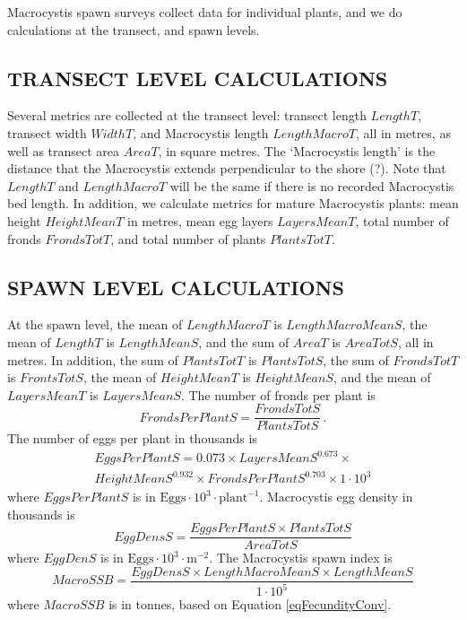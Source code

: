 \documentclass[12pt]{article}
\begin{document}
Macrocystis spawn surveys collect data for individual plants, and we do calculations at the transect, and spawn levels.

\subsection{TRANSECT LEVEL CALCULATIONS}

Several metrics are collected at the transect level: transect length $LengthT$, transect width $WidthT$, and Macrocystis length $LengthMacroT$, all in metres, as well as transect area $AreaT$, in square metres.
The `Macrocystis length' is the distance that the Macrocystis extends perpendicular to the shore (?).
Note that $LengthT$ and $LengthMacroT$ will be the same if there is no recorded Macrocystis bed length.
In addition, we calculate metrics for mature Macrocystis plants: mean height $HeightMeanT$ in metres, mean egg layers $LayersMeanT$, total number of fronds $FrondsTotT$, and total number of plants $PlantsTotT$.

\subsection{SPAWN LEVEL CALCULATIONS}

At the spawn level, the mean of $LengthMacroT$ is $LengthMacroMeanS$, the mean of $LengthT$ is $LengthMeanS$, and the sum of $AreaT$ is $AreaTotS$, all in metres.
In addition, the sum of $PlantsTotT$ is $PlantsTotS$, the sum of $FrondsTotT$ is $FrontsTotS$, the mean of $HeightMeanT$ is $HeightMeanS$, and the mean of $LayersMeanT$ is $LayersMeanS$. 
The number of fronds per plant is
\begin{equation}
FrondsPerPlantS = \frac{FrondsTotS} {PlantsTotS} \, .
\label{eqFrondsPerPlant}
\end{equation}
The number of eggs per plant in thousands is \citep{HaegeleSchweigert1990}
\begin{multline}
EggsPerPlantS = 0.073 \times LayersMeanS^{0.673} \times \\ 
HeightMeanS^{0.932} \times FrondsPerPlantS^{0.703} \times 1 \cdot 10^{3}
\label{eqEggsPerPlantMacro}
\end{multline}
where $EggsPerPlantS$ is in $\text{Eggs} \cdot 10^{3} \cdot \text{plant}^{-1}$. 
Macrocystis egg density in thousands is
\begin{equation}
EggDensS = \frac{EggsPerPlantS \times PlantsTotS} {AreaTotS}
\label{eqEggDensityMacro}
\end{equation}
where $EggDenS$ is in $\text{Eggs} \cdot 10^{3} \cdot \text{m}^{-2}$.
The Macrocystis spawn index is
\begin{equation}
MacroSSB = \frac{EggDensS \times LengthMacroMeanS \times LengthMeanS} {1 \cdot 10^{5}}
\label{eqBiomassMacro}
\end{equation}
where $MacroSSB$ is in tonnes, based on Equation \ref{eqFecundityConv}.
\end{document}
